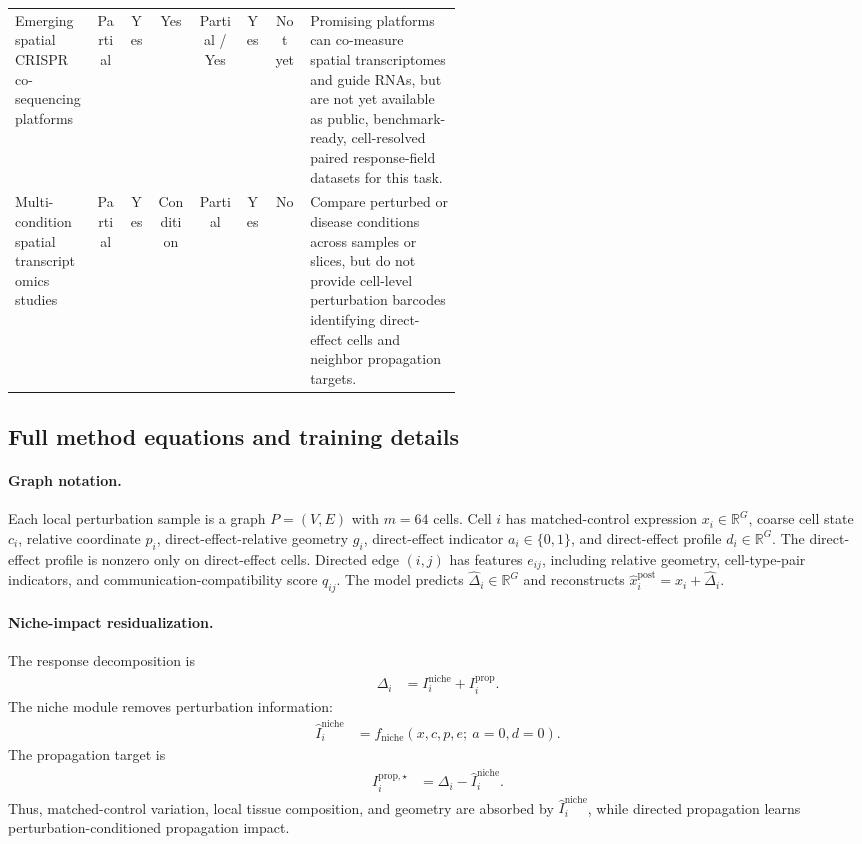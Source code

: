 \documentclass[sigconf,anonymous,review]{acmart}
\begin{document}
\begin{table}[t]
\begin{tabular}{@{}p{0.18\linewidth}ccccccp{0.34\linewidth}@{}}
Emerging spatial CRISPR co-sequencing platforms &
Partial & Yes & Yes & Partial / Yes & Yes & Not yet &
Promising platforms can co-measure spatial transcriptomes and guide RNAs, but are not yet available as public, benchmark-ready, cell-resolved paired response-field datasets for this task. \\

Multi-condition spatial transcriptomics studies &
Partial & Yes & Condition & Partial & Yes & No &
Compare perturbed or disease conditions across samples or slices, but do not provide cell-level perturbation barcodes identifying direct-effect cells and neighbor propagation targets. \\
\bottomrule
\end{tabular}
\end{table}

\subsection{Full method equations and training details}
\label{app:method_full_details}

\paragraph{Graph notation.}
Each local perturbation sample is a graph $P=(V,E)$ with $m=64$ cells. Cell $i$ has matched-control expression $x_i\in\mathbb R^G$, coarse cell state $c_i$, relative coordinate $p_i$, direct-effect-relative geometry $g_i$, direct-effect indicator $a_i\in\{0,1\}$, and direct-effect profile $d_i\in\mathbb R^G$. The direct-effect profile is nonzero only on direct-effect cells. Directed edge $(i,j)$ has features $e_{ij}$, including relative geometry, cell-type-pair indicators, and communication-compatibility score $q_{ij}$. The model predicts $\widehat\Delta_i\in\mathbb R^G$ and reconstructs $\widehat x_i^{\mathrm{post}}=x_i+\widehat\Delta_i$.

\paragraph{Niche-impact residualization.}
The response decomposition is
\[
\begin{aligned}
\Delta_i
&=
I_i^{\mathrm{niche}}+I_i^{\mathrm{prop}} .
\end{aligned}
\]
The niche module removes perturbation information:
\[
\begin{aligned}
\widehat I_i^{\mathrm{niche}}
&=
f_{\mathrm{niche}}(x,c,p,e;\ a=0,d=0).
\end{aligned}
\]
The propagation target is
\[
\begin{aligned}
I_i^{\mathrm{prop},\star}
&=
\Delta_i-\widehat I_i^{\mathrm{niche}} .
\end{aligned}
\]
Thus, matched-control variation, local tissue composition, and geometry are absorbed by $\widehat I_i^{\mathrm{niche}}$, while directed propagation learns perturbation-conditioned propagation impact.
\end{document}
